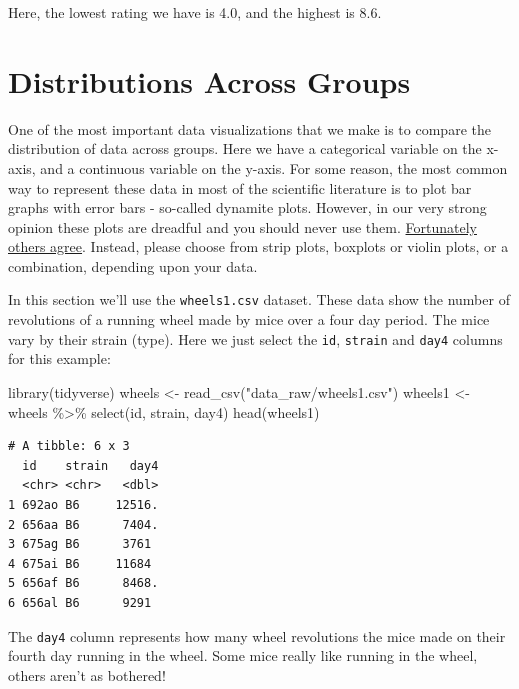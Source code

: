 \documentclass[
  letterpaper,
  DIV=11,
  numbers=noendperiod]{scrreprt}
\newenvironment{Shaded}{\begin{snugshade}}{\end{snugshade}}
\newcommand{\FunctionTok}[1]{\textcolor[rgb]{0.28,0.35,0.67}{#1}}
\newcommand{\NormalTok}[1]{\textcolor[rgb]{0.00,0.23,0.31}{#1}}
\newcommand{\OtherTok}[1]{\textcolor[rgb]{0.00,0.23,0.31}{#1}}
\newcommand{\SpecialCharTok}[1]{\textcolor[rgb]{0.37,0.37,0.37}{#1}}
\newcommand{\StringTok}[1]{\textcolor[rgb]{0.13,0.47,0.30}{#1}}
\begin{document}
Here, the lowest rating we have is 4.0, and the highest is 8.6.


\hypertarget{distributions-across-groups}{%
\chapter{Distributions Across
Groups}\label{distributions-across-groups}}

One of the most important data visualizations that we make is to compare
the distribution of data across groups. Here we have a categorical
variable on the x-axis, and a continuous variable on the y-axis. For
some reason, the most common way to represent these data in most of the
scientific literature is to plot bar graphs with error bars - so-called
dynamite plots. However, in our very strong opinion these plots are
dreadful and you should never use them.
\href{http://biostat.mc.vanderbilt.edu/wiki/pub/Main/TatsukiRcode/Poster3.pdf}{Fortunately
others agree}. Instead, please choose from strip plots, boxplots or
violin plots, or a combination, depending upon your data.

In this section we'll use the \texttt{wheels1.csv} dataset. These data
show the number of revolutions of a running wheel made by mice over a
four day period. The mice vary by their strain (type). Here we just
select the \texttt{id}, \texttt{strain} and \texttt{day4} columns for
this example:

\begin{Shaded}
\begin{Highlighting}[]
\FunctionTok{library}\NormalTok{(tidyverse)}
\NormalTok{wheels }\OtherTok{\textless{}{-}} \FunctionTok{read\_csv}\NormalTok{(}\StringTok{"data\_raw/wheels1.csv"}\NormalTok{)}
\NormalTok{wheels1 }\OtherTok{\textless{}{-}}\NormalTok{ wheels }\SpecialCharTok{\%\textgreater{}\%} \FunctionTok{select}\NormalTok{(id, strain, day4) }
\FunctionTok{head}\NormalTok{(wheels1)}
\end{Highlighting}
\end{Shaded}

\begin{verbatim}
# A tibble: 6 x 3
  id    strain   day4
  <chr> <chr>   <dbl>
1 692ao B6     12516.
2 656aa B6      7404.
3 675ag B6      3761 
4 675ai B6     11684 
5 656af B6      8468.
6 656al B6      9291 
\end{verbatim}

The \texttt{day4} column represents how many wheel revolutions the mice
made on their fourth day running in the wheel. Some mice really like
running in the wheel, others aren't as bothered!
\end{document}
